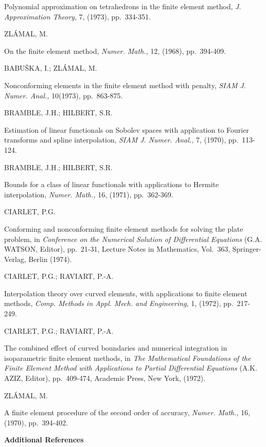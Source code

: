\begin{thebibliography}{99}
Polynomial approximation on tetrahedrons in the finite element method,
{\em J. Approximation Theory}, 7, (1973), pp.~334-351.

 ZL\'AMAL, M.\pageoriginale

On the finite element method, {\em Numer. Math.,} 12, (1968), pp.~394-409.

 BABU\v{S}KA, I.; ZL\'AMAL, M.

Nonconforming elements in the finite element method with penalty, {\em
  SIAM J. Numer. Anal.,} 10(1973), pp.~863-875.

 BRAMBLE, J.H.; HILBERT, S.R.

Estimation of linear functionals on Sobolev spaces with application to
Fourier transforms and spline interpolation, {\em SIAM
  J. Numer. Anal.,} 7, (1970), pp.~113-124.

 BRAMBLE, J.H.; HILBERT, S.R.

Bounds for a class of linear functionals with applications to Hermite
interpolation, {\em Numer. Math.,} 16, (1971), pp.~362-369.

 CIARLET, P.G.

Conforming and nonconforming finite element methods for solving the
plate problem, in {\em Conference on the Numerical Solution of
  Differential Equations} (G.A. WATSON, Editor), pp.~21-31, Lecture
Notes in Mathematics, Vol.~363, Springer-Verlag, Berlin (1974).

 CIARLET, P.G.; RAVIART, P.-A.

Interpolation theory over curved elements, with applications to finite
element methods, {\em Comp. Methods in Appl. Mech. and Engineering,}
1, (1972), pp.~217-249.

 CIARLET, P.G.; RAVIART, P.-A.

The combined effect of curved boundaries and numerical integration in
isoparametric finite element methods, in {\em The Mathematical
  Foundations of the Finite Element Method with Applications to
  Partial Differential Equations} (A.K. AZIZ, Editor), pp.~409-474,
Academic Press, New York, (1972).

 ZL\'AMAL, M.

A finite element procedure of the second order of accuracy, {\em
  Numer. Math.,} 16, (1970), pp.~394-402.
\end{thebibliography}

\newpage

\begin{center}
{\Large\bf Additional References}\pageoriginale
\end{center}

